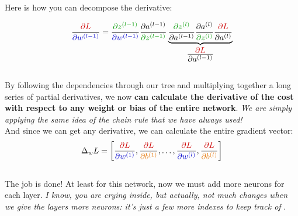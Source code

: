 \begin{minipage}{0.55\textwidth}

Here is how you can decompose the derivative:

\vspace{-0.3cm}
$$\frac{\textcolor{myred}{\partial L}}{\textcolor{myblue}{\partial w^{(l-1)}}} = 
\frac{\textcolor{mygreen}{\partial z^{(l-1)}}}{\textcolor{myblue}{\partial w^{(l-1)}}}  
\frac{\partial a^{(l-1)}}{\textcolor{mygreen}{\partial z^{(l-1)}}} 
\underbrace{
\frac{\textcolor{mygreen}{\partial z^{(l)}}}{\partial a^{(l-1)}}  
\frac{\partial a^{(l)}}{\textcolor{mygreen}{\partial z^{(l)}}} 
\frac{\textcolor{myred}{\partial L}}{\partial a^{(l)}}}_\textrm{\Large$\frac{\textcolor{myred}{\partial L}}{\partial a^{(l-1)}}$}$$
\vspace{-0.3cm}
\ \\
By following the dependencies through our tree and multiplying together a long series of partial derivatives, we now \textbf{can calculate the derivative of the cost with respect to any weight or bias of the entire network}. \textit{We are simply applying the same idea of the chain rule that we have always used!} \\

And since we can get any derivative, we can calculate the entire gradient vector:
\vspace{-0.1cm}
$$
\Delta_w L = \left[ \frac{\textcolor{myred}{\partial L}}{\textcolor{myblue}{\partial w^{(1)}}}, \frac{\textcolor{myred}{\partial L}}{\textcolor{myorange}{\partial b^{(1)}}}, \ldots , \frac{\textcolor{myred}{\partial L}}{\textcolor{myblue}{\partial w^{(l)}}}, \frac{\textcolor{myred}{\partial L}}{\textcolor{myorange}{\partial b^{(l)}}}\right] 
$$
\vspace{-0.3cm}
\ \\
The job is done! At least for this network, now we must add more neurons for each layer. \textit{I know, you are crying inside, but actually, not much changes when we give the layers more neurons: it's just a few more indexes to keep track of }.

\vspace{1cm}

\end{minipage}

